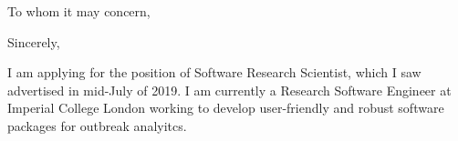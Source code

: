 


\clearpage

\date{\today} %
\opening{To whom it may concern,} %
\closing{Sincerely,} %

\makelettertitle %

I am applying for the position of Software Research Scientist, which I saw 
advertised in mid-July of 2019. I am currently a Research Software Engineer at
Imperial College London working to develop user-friendly and robust software
packages for outbreak analyitcs.

\makeletterclosing %






